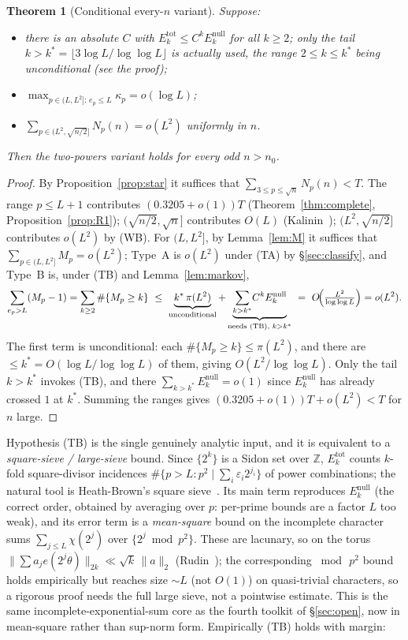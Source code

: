 \documentclass[11pt]{article}
\theoremstyle{plain}
\newtheorem{theorem}{Theorem}[section]
\theoremstyle{definition}
\theoremstyle{remark}
\newcommand{\Z}{\mathbb{Z}}
\newcommand{\ep}{e_p}
\begin{document}
\begin{theorem}[Conditional every-$n$ variant]\label{thm:conditional}
Suppose:
\begin{itemize}
\item[\textup{(TB)}] there is an absolute $C$ with
$E_k^{\mathrm{tot}}\le C^kE_k^{\mathrm{null}}$ for all $k\ge2$; only the tail
$k>k^\ast=\lfloor3\log L/\log\log L\rfloor$ is actually used, the range
$2\le k\le k^\ast$ being unconditional (see the proof);
\item[\textup{(TA)}] $\displaystyle\max_{p\in(L,L^2]:\,\ep\le L}\kappa_p=o(\log L)$;
\item[\textup{(WB)}] $\sum_{p\in(L^2,\sqrt{n/2}]}N_p(n)=o(L^2)$ uniformly in $n$.
\end{itemize}
Then the two-powers variant holds for every odd $n>n_0$.
\end{theorem}
\begin{proof}
By Proposition~\ref{prop:star} it suffices that $\sum_{3\le p\le\sqrt n}N_p(n)<T$.
The range $p\le L+1$ contributes $(0.3205+o(1))T$ (Theorem~\ref{thm:complete},
Proposition~\ref{prop:R1}); $(\sqrt{n/2},\sqrt n]$ contributes $O(L)$
(Kalinin~\cite{Kalinin2026}); $(L^2,\sqrt{n/2}]$ contributes $o(L^2)$ by (WB). For
$(L,L^2]$, by Lemma~\ref{lem:M} it suffices that $\sum_{p\in(L,L^2]}M_p=o(L^2)$;
Type~A is $o(L^2)$ under (TA) by \S\ref{sec:classify}, and Type~B is, under (TB)
and Lemma~\ref{lem:markov},
\[
\sum_{\ep>L}(M_p-1)=\sum_{k\ge2}\#\{M_p\ge k\}
\ \le\ \underbrace{k^\ast\,\pi(L^2)}_{\text{unconditional}}
+\underbrace{\sum_{k>k^\ast}\!C^kE_k^{\mathrm{null}}}_{\text{needs (TB), }k>k^\ast}
\ =\ O\!\Bigl(\tfrac{L^2}{\log\log L}\Bigr)=o(L^2).
\]
The first term is unconditional: each $\#\{M_p\ge k\}\le\pi(L^2)$, and there are
$\le k^\ast=O(\log L/\log\log L)$ of them, giving $O(L^2/\log\log L)$. Only the tail
$k>k^\ast$ invokes (TB), and there $\sum_{k>k^\ast}E_k^{\mathrm{null}}=o(1)$ since
$E_k^{\mathrm{null}}$ has already crossed $1$ at $k^\ast$. Summing the ranges gives
$(0.3205+o(1))T+o(L^2)<T$ for $n$ large.
\end{proof}

Hypothesis (TB) is the single genuinely analytic input, and it is equivalent to a
\emph{square-sieve / large-sieve} bound. Since $\{2^k\}$ is a Sidon set over
$\Z$, $E_k^{\mathrm{tot}}$ counts $k$-fold square-divisor incidences
$\#\{p>L:p^2\mid\sum_i\varepsilon_i2^{j_i}\}$ of power combinations; the natural
tool is Heath-Brown's square sieve~\cite{HeathBrown1984}. Its main term
reproduces $E_k^{\mathrm{null}}$ (the correct order, obtained by averaging over
$p$: per-prime bounds are a factor $L$ too weak), and its error term is a
\emph{mean-square} bound on the incomplete character sums $\sum_{j\le L}\chi(2^j)$
over $\{2^j\bmod p^2\}$. These are lacunary, so on the torus
$\|\sum a_je(2^j\theta)\|_{2k}\ll\sqrt k\,\|a\|_2$
(Rudin~\cite{Rudin1960}); the corresponding $\bmod\,p^2$ bound holds empirically
but reaches size $\sim L$ (not $O(1)$) on quasi-trivial characters, so a rigorous
proof needs the full large sieve, not a pointwise estimate. This is the same
incomplete-exponential-sum core as the fourth toolkit of \S\ref{sec:open}, now in
mean-square rather than sup-norm form. Empirically (TB) holds with margin:
\end{document}
